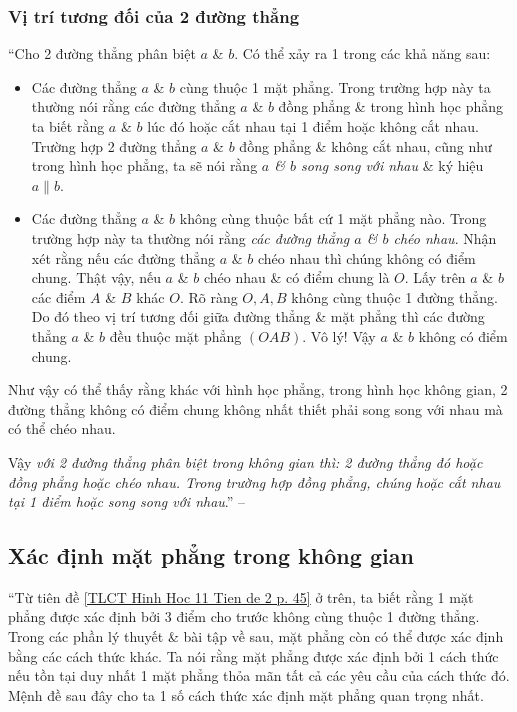 \documentclass[oneside]{book}
\numberwithin{equation}{section}
\begin{document}
\subsubsection{Vị trí tương đối của 2 đường thẳng}
``Cho 2 đường thẳng phân biệt $a$ \& $b$. Có thể xảy ra 1 trong các khả năng sau:
\begin{itemize}
	\item Các đường thẳng $a$ \& $b$ cùng thuộc 1 mặt phẳng. Trong trường hợp này ta thường nói rằng các đường thẳng $a$ \& $b$ đồng phẳng \& trong hình học phẳng ta biết rằng $a$ \& $b$ lúc đó hoặc cắt nhau tại 1 điểm hoặc không cắt nhau. Trường hợp 2 đường thẳng $a$ \& $b$ đồng phẳng \& không cắt nhau, cũng như trong hình học phẳng, ta sẽ nói rằng \textit{$a$ \& $b$ song song với nhau} \& ký hiệu $a\parallel b$.
	\item Các đường thẳng $a$ \& $b$ không cùng thuộc bất cứ 1 mặt phẳng nào. Trong trường hợp này ta thường nói rằng \textit{các đường thẳng $a$ \& $b$ chéo nhau}. Nhận xét rằng nếu các đường thẳng $a$ \& $b$ chéo nhau thì chúng không có điểm chung. Thật vậy, nếu $a$ \& $b$ chéo nhau \& có điểm chung là $O$. Lấy trên $a$ \& $b$ các điểm $A$ \& $B$ khác $O$. Rõ ràng $O,A,B$ không cùng thuộc 1 đường thẳng. Do đó theo vị trí tương đối giữa đường thẳng \& mặt phẳng thì các đường thẳng $a$ \& $b$ đều thuộc mặt phẳng $(OAB)$. Vô lý! Vậy $a$ \& $b$ không có điểm chung.
\end{itemize}
Như vậy có thể thấy rằng khác với hình học phẳng, trong hình học không gian, 2 đường thẳng không có điểm chung không nhất thiết phải song song với nhau mà có thể chéo nhau.

Vậy \textit{với 2 đường thẳng phân biệt trong không gian thì: 2 đường thẳng đó hoặc đồng phẳng hoặc chéo nhau. Trong trường hợp đồng phẳng, chúng hoặc cắt nhau tại 1 điểm hoặc song song với nhau}.'' -- \cite[pp. 47--48]{TL_chuyen_Toan_Hinh_Hoc_11}

\subsection{Xác định mặt phẳng trong không gian}
``Từ tiên đề \ref{TLCT Hinh Hoc 11 Tien de 2 p. 45} ở trên, ta biết rằng 1 mặt phẳng được xác định bởi 3 điểm cho trước không cùng thuộc 1 đường thẳng. Trong các phần lý thuyết \& bài tập về sau, mặt phẳng còn có thể được xác định bằng các cách thức khác. Ta nói rằng mặt phẳng được xác định bởi 1 cách thức nếu tồn tại duy nhất 1 mặt phẳng thỏa mãn tất cả các yêu cầu của cách thức đó. Mệnh đề sau đây cho ta 1 số cách thức xác định mặt phẳng quan trọng nhất.
\end{document}
